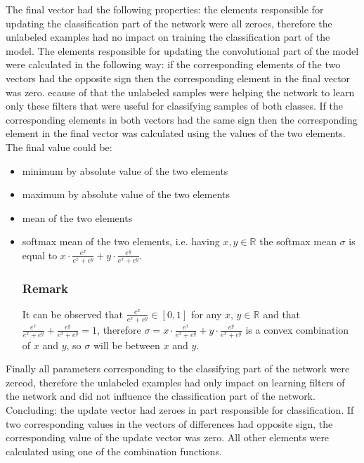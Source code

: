 \documentclass[a4paper,10pt]{report}
\begin{document}
      The final vector had the following properties: the elements responsible for updating the classification part of the network were all zeroes, therefore the unlabeled examples had no impact on training the classification part of the model. The elements responsible for updating the convolutional part of the model were calculated in the following way: if the corresponding elements of the two vectors had the opposite sign then the corresponding element in the final vector was zero. ecause of that the unlabeled samples were helping the network to learn only these filters that were useful for classifying samples of both classes. If the corresponding elements in both vectors had the same sign then the corresponding element in the final vector was calculated using the values of the two elements. The final value could be:
      
      \begin{itemize}
       \item minimum by absolute value of the two elements
       \item maximum by absolute value of the two elements
       \item mean of the two elements
       \item softmax mean of the two elements, i.e. having $x, y \in \mathbb{R}$ the softmax mean $\sigma$ is equal to $x \cdot \frac{e^x}{e^x + e^y} + y \cdot \frac{e^y}{e^x + e^y}$.
       
       \subsubsection{Remark}
       It can be observed that $\frac{e^x}{e^x + e^y} \in [0, 1]$ for any $x$, $y \in \mathbb{R}$ and that $\frac{e^x}{e^x + e^y} + \frac{e^y}{e^x + e^y} = 1$, therefore $\sigma = x \cdot \frac{e^x}{e^x + e^y} + y \cdot \frac{e^y}{e^x + e^y}$ is a convex combination of $x$ and $y$, so $\sigma$ will be between $x$ and $y$.\\
      \end{itemize}
      
      Finally all parameters corresponding to the classifying part of the network were zereod, therefore the unlabeled examples had only impact on learning filters of the network and did not influence the classification part of the network.\\
	
      Concluding: the update vector had zeroes in part responsible for classification. If two corresponding values in the vectors of differences had opposite sign, the corresponding value of the update vector was zero. All other elements were calculated using one of the combination functions.\\
      
\end{document}
